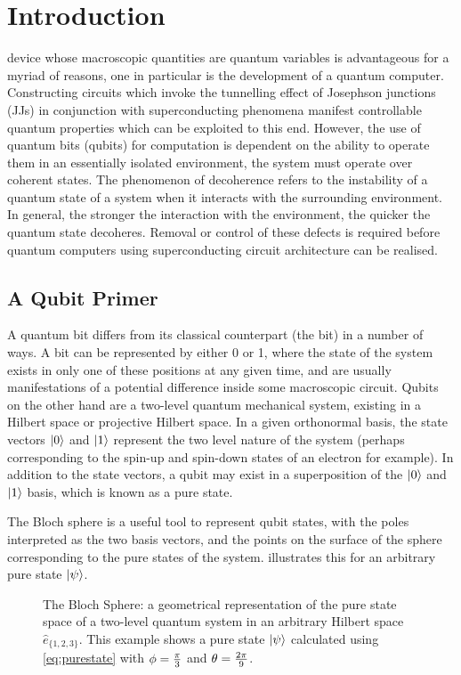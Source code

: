 \chapter{Introduction}

 device whose macroscopic quantities are quantum variables is advantageous for a myriad of reasons, one in particular is the development of a quantum computer.
Constructing circuits which invoke the tunnelling effect of Josephson junctions (JJs) in conjunction with superconducting phenomena manifest controllable quantum properties which can be exploited to this end.
However, the use of quantum bits (qubits) for computation is dependent on the ability to operate them in an essentially isolated environment, \ie the system must operate over coherent states.
The phenomenon of decoherence refers to the instability of a quantum state of a system when it interacts with the surrounding environment.
In general, the stronger the interaction with the environment, the quicker the quantum state decoheres.
Removal or control of these defects is required before quantum computers using superconducting circuit architecture can be realised.

\section{A Qubit Primer}
A quantum bit differs from its classical counterpart (the bit) in a number of ways.
A bit can be represented by either 0 or 1, where the state of the system exists in only one of these positions at any given time, and are usually manifestations of a potential difference inside some macroscopic circuit.
Qubits on the other hand are a two-level quantum mechanical system, existing in a Hilbert space or projective Hilbert space.
In a given orthonormal basis, the state vectors $\lvert0\rangle$ and $\lvert1\rangle$ represent the two level nature of the system (perhaps corresponding to the spin-up and spin-down states of an electron for example).
In addition to the state vectors, a qubit may exist in a superposition of the $\lvert0\rangle$ and $\lvert1\rangle$ basis, which is known as a pure state.

The Bloch sphere \cite{Bloch1946} is a useful tool to represent qubit states, with the poles interpreted as the two basis vectors, and the points on the surface of the sphere corresponding to the pure states of the system.
 illustrates this for an arbitrary pure state $\lvert\psi\rangle$.
\begin{figure}[htp]
\resizebox{0.5\textwidth}{!}{}
\caption[Bloch Sphere]{\label{fig:bloch}The Bloch Sphere: a geometrical representation of the pure state space of a two-level quantum system in an arbitrary Hilbert space $\hat{e}_{\{1,2,3\}}$. This example shows a pure state $\lvert\psi\rangle$ calculated using \cref{eq:purestate} with $\cramped{\phi=\frac{\pi}{3}}$ and $\cramped{\theta=\frac{2\pi}{9}}$. }
\end{figure}

